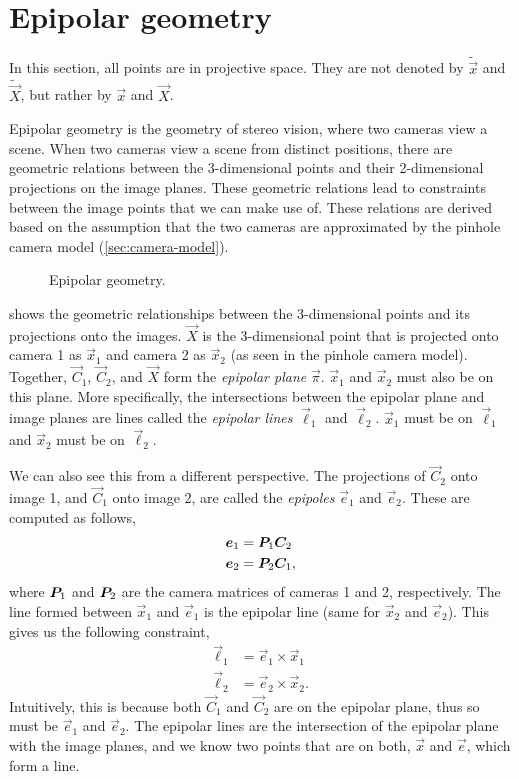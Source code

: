 \section{Epipolar geometry}

\begin{remark}
    In this section, all points are in projective space. They are not denoted by
    $\tilde{\vec{x}}$ and $\tilde{\vec{X}}$, but rather by $\vec{x}$ and
    $\vec{X}$.
\end{remark}

Epipolar geometry is the geometry of stereo vision, where two cameras view a
scene. When two cameras view a scene from distinct positions, there are
geometric relations between the 3-dimensional points and their 2-dimensional
projections on the image planes. These geometric relations lead to constraints
between the image points that we can make use of. These relations are derived
based on the assumption that the two cameras are approximated by the pinhole
camera model (\cref{sec:camera-model}).

\begin{figure}[h!]
    \centering
    \caption{Epipolar geometry.}
    \label{fig:epipolar-geometry}
\end{figure}

 shows the geometric relationships between the
3-dimensional points and its projections onto the images. $\vec{X}$ is the
3-dimensional point that is projected onto camera 1 as $\vec{x}_1$ and camera 2
as $\vec{x}_2$ (as seen in the pinhole camera model). Together, $\vec{C}_1$,
$\vec{C}_2$, and $\vec{X}$ form the \textit{epipolar plane} $\vec{\pi}$.
$\vec{x}_1$ and $\vec{x}_2$ must also be on this plane. More specifically, the
intersections between the epipolar plane and image planes are lines called the
\textit{epipolar lines} $\vec{\ell}_1$ and $\vec{\ell}_2$. $\vec{x}_1$ must be
on $\vec{\ell}_1$ and $\vec{x}_2$ must be on $\vec{\ell}_2$.

We can also see this from a different perspective. The projections of
$\vec{C}_2$ onto image 1, and $\vec{C}_1$ onto image 2, are called the
\textit{epipoles} $\vec{e}_1$ and $\vec{e}_2$. These are computed as follows,
\begin{align*}
    \bm{e}_1 & = \bm{P}_1 \bm{C}_2  \\
    \bm{e}_2 & = \bm{P}_2 \bm{C}_1,
\end{align*}
where $\bm{P}_1$ and $\bm{P}_2$ are the camera matrices of cameras 1 and 2,
respectively. The line formed between $\vec{x}_1$ and $\vec{e}_1$ is the
epipolar line (same for $\vec{x}_2$ and $\vec{e}_2$). This gives us the
following constraint,
\begin{align*}
    \vec{\ell}_1 & = \vec{e}_1 \times \vec{x}_1  \\
    \vec{\ell}_2 & = \vec{e}_2 \times \vec{x}_2.
\end{align*}
Intuitively, this is because both $\vec{C}_1$ and $\vec{C}_2$ are on the
epipolar plane, thus so must be $\vec{e}_1$ and $\vec{e}_2$. The epipolar lines
are the intersection of the epipolar plane with the image planes, and we know
two points that are on both, $\vec{x}$ and $\vec{e}$, which form a line.


